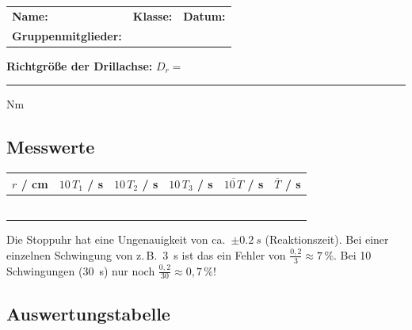 \documentclass[11pt,a4paper]{scrartcl}
\begin{document}
\begin{center}
	\begin{tcolorbox}[colback=white, colframe=black, width=\textwidth, boxrule=0.5pt]
		\begin{tabular}{@{}p{}p{}p{}@{}}
			\textbf{Name:} \hrulefill & \textbf{Klasse:} \hrulefill & \textbf{Datum:} \hrulefill \\[0.4cm]
			\textbf{Gruppenmitglieder:} & \multicolumn{2}{l}{\hrulefill} \\
		\end{tabular}
	\end{tcolorbox}
\end{center}

\textbf{Richtgröße der Drillachse:} $D_r = $ \rule{3cm}{0.4pt} Nm

\subsection*{Messwerte}

\begin{center}
	\renewcommand{\arraystretch}{2.0}
	\begin{tabular}{|c|c|c|c|c|c|}
		\hline
		$r$ / cm & $10\,T_1$ / s & $10\,T_2$ / s & $10\,T_3$ / s & $\overline{10\,T}$ / s & $\overline{T}$ / s \\
		\hline
		& & & & & \\
		\hline
		& & & & & \\
		\hline
		& & & & & \\
		\hline
		& & & & & \\
		\hline
		& & & & & \\
		\hline
		& & & & & \\
		\hline
	\end{tabular}
\end{center}

\begin{hilfebox}[title={\faIcon{lightbulb} Warum 10 Schwingungen messen?}]
	Die Stoppuhr hat eine Ungenauigkeit von ca.\ $\pm\SI{0,2}{s}$ (Reaktionszeit). Bei einer einzelnen Schwingung von z.\,B.\ \SI{3}{s} ist das ein Fehler von $\frac{0{,}2}{3} \approx 7\,\%$. Bei 10 Schwingungen (\SI{30}{s}) nur noch $\frac{0{,}2}{30} \approx 0{,}7\,\%$!
\end{hilfebox}

\subsection*{Auswertungstabelle}
\end{document}
